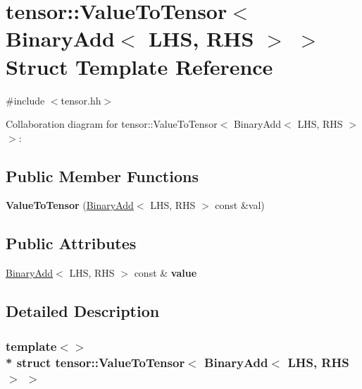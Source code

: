 \hypertarget{structtensor_1_1ValueToTensor_3_01BinaryAdd_3_01LHS_00_01RHS_01_4_01_4}{}\section{tensor\+:\+:Value\+To\+Tensor$<$ Binary\+Add$<$ L\+HS, R\+HS $>$ $>$ Struct Template Reference}
\label{structtensor_1_1ValueToTensor_3_01BinaryAdd_3_01LHS_00_01RHS_01_4_01_4}


{\ttfamily \#include $<$tensor.\+hh$>$}



Collaboration diagram for tensor\+:\+:Value\+To\+Tensor$<$ Binary\+Add$<$ L\+HS, R\+HS $>$ $>$\+:
\subsection*{Public Member Functions}
\begin{DoxyCompactItemize}
\item 
{\bfseries Value\+To\+Tensor} (\hyperlink{classtensor_1_1BinaryAdd}{Binary\+Add}$<$ L\+HS, R\+HS $>$ const \&val)\hypertarget{structtensor_1_1ValueToTensor_3_01BinaryAdd_3_01LHS_00_01RHS_01_4_01_4_a9532d02fec9537ae17259ccc3082b2e7}{}\label{structtensor_1_1ValueToTensor_3_01BinaryAdd_3_01LHS_00_01RHS_01_4_01_4_a9532d02fec9537ae17259ccc3082b2e7}

\end{DoxyCompactItemize}
\subsection*{Public Attributes}
\begin{DoxyCompactItemize}
\item 
\hyperlink{classtensor_1_1BinaryAdd}{Binary\+Add}$<$ L\+HS, R\+HS $>$ const \& {\bfseries value}\hypertarget{structtensor_1_1ValueToTensor_3_01BinaryAdd_3_01LHS_00_01RHS_01_4_01_4_ad1e8bfaf387d7959c5b54066b708caaf}{}\label{structtensor_1_1ValueToTensor_3_01BinaryAdd_3_01LHS_00_01RHS_01_4_01_4_ad1e8bfaf387d7959c5b54066b708caaf}

\end{DoxyCompactItemize}


\subsection{Detailed Description}
\subsubsection*{template$<$$>$\\*
struct tensor\+::\+Value\+To\+Tensor$<$ Binary\+Add$<$ L\+H\+S, R\+H\+S $>$ $>$}

